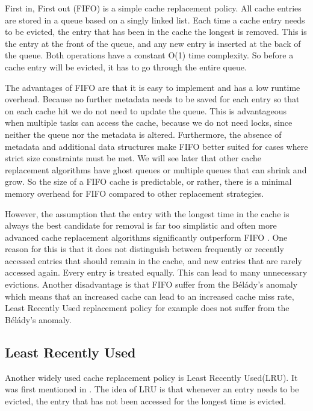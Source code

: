 \documentclass[
	12pt,
	a4paper,
	abstract,
	bibliography=totoc,
	chapterprefix,
	headings=openright,
	numbers=endperiod,
	parskip=half,
	twoside,
]{scrreprt}
\begin{document}
First in, First out (FIFO) is a simple cache replacement policy.
All cache entries are stored in a queue based on a singly linked list.
Each time a cache entry needs to be evicted, the entry that has been in the cache the longest is removed.
This is the entry at the front of the queue, and any new entry is inserted at the back of the queue. Both operations have a constant O(1) time complexity.
So before a cache entry will be evicted, it has to go through the entire queue.

The advantages of FIFO are that it is easy to implement and has a low runtime overhead.
Because no further metadata needs to be saved for each entry so that on each cache hit we do not need to update the queue.
This is advantageous when multiple tasks can access the cache, 
because we do not need locks, since neither the queue nor the metadata is altered.
Furthermore, the absence of metadata and additional data structures make FIFO better suited for cases where strict size constraints must be met. 
We will see later that other cache replacement algorithms have ghost queues or multiple queues that can shrink and grow. So the size 
of a FIFO cache is predictable, or rather, there is a minimal memory overhead for FIFO compared to other replacement strategies.

However, the assumption that the entry with the longest time in the cache is always the best candidate for removal is far too 
simplistic and often more advanced cache replacement algorithms significantly outperform FIFO \cite{van1992lru}.
One reason for this is that it does not distinguish between frequently or recently accessed entries that should remain in the cache, and new entries that are rarely accessed again. Every entry is treated equally. This can lead to many unnecessary evictions.
Another disadvantage is that FIFO suffer from the Bélády's anomaly \cite{10.1145/363011.363155} which means that an increased cache can lead to an increased cache miss rate, Least Recently Used replacement policy for example does not suffer from the Bélády's anomaly.

\subsection{Least Recently Used}
Another widely used cache replacement policy is Least Recently Used(LRU).
It was first mentioned in \cite{denning1980working}.
The idea of LRU is that whenever an entry needs to be evicted, the entry that has not been accessed for the longest time is evicted.
\end{document}
